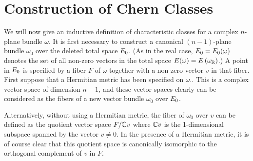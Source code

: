 \documentclass[../main]{subfiles}
\begin{document}
\section{Construction of Chern Classes}

We will now give an inductive definition of characteristic classes for a complex $n$-plane bundle $\omega$. It is first necessary to construct a canonical $(n-1)$-plane bundle $\omega_{0}$ over the deleted total space $E_{0}$. (As in the real case, $E_{0}=E_{0}(\omega)$ denotes the set of all non-zero vectors in the total space $E(\omega)=E\left(\omega_{\mathbb R}\right)$.) A point in $E_{0}$ is specified by a fiber $F$ of $\omega$ together with a non-zero vector $v$ in that fiber. First suppose that a Hermitian metric has been specified on $\omega$.. This is a complex vector space of dimension $n-1$, and these vector spaces clearly can be considered as the fibers of a new vector bundle $\omega_{0}$ over $E_{0}$.

Alternatively, without using a Hermitian metric, the fiber of $\omega_0$ over $v$ can be defined as the quotient vector space $F/\mathbb C v$ where $\mathbb C v$ is the 1-dimensional subspace spanned by the vector $v\neq 0$. In the presence of a Hermitian metric, it is of course clear that this quotient space is canonically isomorphic to the orthogonal complement of $v$ in $F$.
\end{document}
